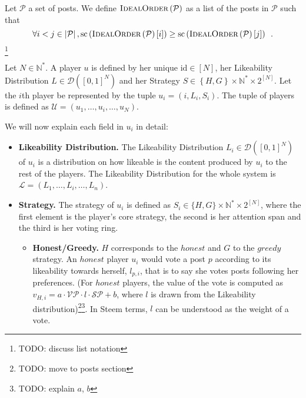     \begin{definition}
      Let $\mathcal{P}$ a set of posts. We define
      $\textsc{IdealOrder}\left(\mathcal{P}\right)$ as a list of the posts in
      $\mathcal{P}$ such that
      \begin{equation*}
        \forall i < j \in \left|\mathcal{P}\right|,
        \mathrm{sc}\left(\textsc{IdealOrder}
        \left(\mathcal{P}\right)\left[i\right]\right) \geq
        \mathrm{sc}\left(\textsc{IdealOrder}
        \left(\mathcal{P}\right)\left[j\right]\right) \enspace.
      \end{equation*}\footnote{TODO: discuss list notation}
    \end{definition}

    \begin{definition}[Player]
      Let $N \in \mathbb{N}^{*}$. A player $u$ is defined by her unique
      $\mathrm{id} \in \left[N\right]$, her Likeability Distribution $L \in
      \mathcal{D} \left(\left[0, 1\right]^N\right)$ and her Strategy $S \in
      \left\{H, G\right\} \times \mathbb{N}^* \times 2^{\left[N\right]}$. Let
      the $i$th player be represented by the tuple $u_i = \left(i, L_i,
      S_i\right)$. The tuple of players is defined as $\mathcal{U} = \left(u_1,
      \dots, u_i, \dots, u_N\right)$.

      We will now explain each field in $u_i$ in detail:
      \begin{itemize}
        \item \textbf{Likeability Distribution.} The Likeability Distribution
        $L_i \in \mathcal{D}\left([0,1]^N\right)$ of $u_i$ is a distribution on
        how likeable is the content produced by $u_i$ to the rest of the
        players. The Likeability Distribution for the whole system is
        $\mathcal{L} = \left(L_1, \dots, L_i, \dots, L_n\right)$.

        \item \textbf{Strategy.} The strategy of $u_i$ is defined as $S_i \in
        \lbrace H, G \rbrace \times \mathbb{N}^* \times 2^{\left[N\right]}$,
        where the first element is the player's core strategy, the second is her
        attention span and the third is her voting ring.
        \begin{itemize}
          \item \textbf{Honest/Greedy.} $H$ corresponds to the $honest$ and $G$
          to the $greedy$ strategy. An $honest$ player $u_i$ would vote a post
          $p$ according to its likeability towards herself, $l_{p, i}$, that is
          to say she votes posts following her preferences. (For $honest$
          players, the value of the vote is computed as $v_{H,i} = a \cdot
          \mathcal{VP} \cdot l \cdot \mathcal{SP} + b$, where $l$ is drawn from
          the Likeability distribution)\footnote{TODO: move to posts
          section}\fnmsep\footnote{TODO: explain $a$, $b$}. In Steem terms, $l$
          can be understood as the weight of a vote.


\end{itemize}
\end{itemize}
\end{definition}
